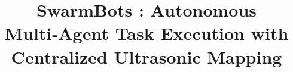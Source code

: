 \documentclass[conference]{IEEEtran}
\DeclareMathOperator*{\Res}{Res}
\begin{document}
\newtheorem{theorem}{Theorem}[section]
\newtheorem{problem}{Problem}
\newtheorem{proposition}{Proposition}[section]
\newtheorem{lemma}{Lemma}[section]
\newtheorem{corollary}[theorem]{Corollary}
\newtheorem{example}{Example}[section]
\newtheorem{definition}[problem]{Definition}
\newcommand{\BEQA}{\begin{eqnarray}}
\newcommand{\EEQA}{\end{eqnarray}}
\newcommand{\define}{\stackrel{\triangle}{=}}
\providecommand{\mbf}{\mathbf}
\providecommand{\pr}[1]{\ensuremath{\Pr\left(#1\right)}}
\providecommand{\qfunc}[1]{\ensuremath{Q\left(#1\right)}}
\providecommand{\sbrak}[1]{\ensuremath{{}\left[#1\right]}}
\providecommand{\lsbrak}[1]{\ensuremath{{}\left[#1\right.}}
\providecommand{\rsbrak}[1]{\ensuremath{{}\left.#1\right]}}
\providecommand{\brak}[1]{\ensuremath{\left(#1\right)}}
\providecommand{\lbrak}[1]{\ensuremath{\left(#1\right.}}
\providecommand{\rbrak}[1]{\ensuremath{\left.#1\right)}}
\providecommand{\cbrak}[1]{\ensuremath{\left\{#1\right\}}}
\providecommand{\lcbrak}[1]{\ensuremath{\left\{#1\right.}}
\providecommand{\rcbrak}[1]{\ensuremath{\left.#1\right\}}}
\theoremstyle{remark}
\newtheorem{rem}{Remark}
\newcommand{\sgn}{\mathop{\mathrm{sgn}}}
\providecommand{\abs}[1]{\left\vert#1\right\vert}
\providecommand{\res}[1]{\Res\displaylimits_{#1}} 
\providecommand{\norm}[1]{\left\lVert#1\right\rVert}
\providecommand{\mtx}[1]{\mathbf{#1}}
\providecommand{\mean}[1]{E\left[ #1 \right]}   
\providecommand{\fourier}{\overset{\mathcal{F}}{ \rightleftharpoons}}
\providecommand{\system}[1]{\overset{\mathcal{#1}}{ \longleftrightarrow}}
\newcommand{\solution}{\noindent \textbf{Solution: }}
\newcommand{\cosec}{\,\text{cosec}\,}
\providecommand{\dec}[2]{\ensuremath{\overset{#1}{\underset{#2}{\gtrless}}}}
\newcommand{\myvec}[1]{\ensuremath{\begin{pmatrix}#1\end{pmatrix}}}
\newcommand{\mydet}[1]{\ensuremath{\begin{vmatrix}#1\end{vmatrix}}}
\renewcommand{\vec}[1]{\boldsymbol{\mathbf{#1}}}
\def\putbox#1#2#3{\makebox[0in][l]{\makebox[#1][l]{}\raisebox{\baselineskip}[0in][0in]{\raisebox{#2}[0in][0in]{#3}}}}
     \def\rightbox#1{\makebox[0in][r]{#1}}
     \def\centbox#1{\makebox[0in]{#1}}
     \def\topbox#1{\raisebox{-\baselineskip}[0in][0in]{#1}}
     \def\midbox#1{\raisebox{-0.5\baselineskip}[0in][0in]{#1}}

\title{SwarmBots : Autonomous Multi‑Agent Task Execution with Centralized Ultrasonic Mapping}
\end{document}
